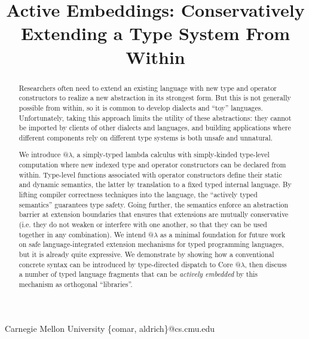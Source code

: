 \documentclass[9pt,preprint]{sigplanconf}
\begin{document}
\conferenceinfo{-}{-} 
\copyrightyear{-} 
\copyrightdata{[to be supplied]} 


\title{Active Embeddings: Conservatively Extending a Type System From Within}

           {Carnegie Mellon University}
            {\{comar, aldrich\}@cs.cmu.edu}   

\maketitle
\begin{abstract}
Researchers often need to extend an existing language with new type and operator constructors to realize a new abstraction in its strongest form. 
But this is not generally possible from within, so it is common to develop dialects and ``toy'' languages.
Unfortunately, taking this approach limits the utility of these abstractions: they cannot be imported by clients of other dialects and languages, and building applications where different components rely on different type systems is both unsafe and unnatural. 

We introduce @$\lambda$, a simply-typed lambda calculus with simply-kinded type-level computation where new indexed type and operator constructors can be declared  from within. %
Type-level functions associated with operator constructors define their static and dynamic semantics, the latter by translation to a fixed typed internal language. By lifting compiler correctness techniques into the language, the ``actively typed semantics'' guarantees type safety. Going further, the semantics enforce an abstraction barrier at extension boundaries that ensures that extensions are mutually conservative (i.e. they do not weaken or interfere with one another, so that they can  be used together in any combination). 
We intend @$\lambda$ as a minimal foundation for future work on safe language-integrated extension mechanisms for typed programming languages, but it is already quite expressive. We demonstrate by showing how a conventional concrete syntax can be introduced by type-directed dispatch to Core @$\lambda$, then discuss a number of typed language fragments that can be \emph{actively embedded} by this mechanism as orthogonal ``libraries''. %
\end{abstract}
\end{document}
